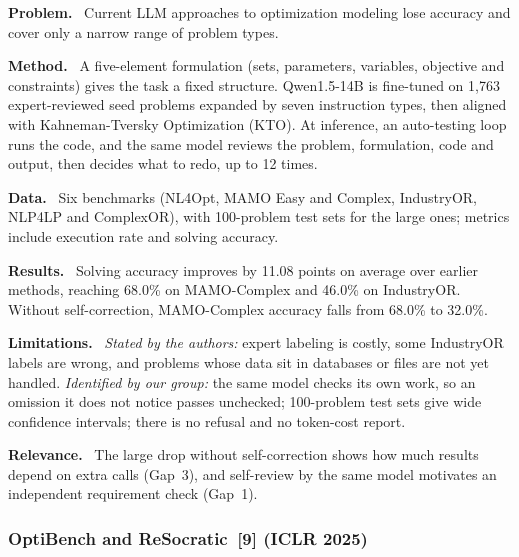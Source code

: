 \documentclass[11pt,a4paper]{article}
\newcommand{\elem}[1]{\par\noindent\textbf{#1.}~}
\begin{document}
\elem{Problem} Current LLM approaches to optimization modeling lose accuracy and cover only a narrow range of problem types.
\elem{Method} A five-element formulation (sets, parameters, variables, objective and constraints) gives the task a fixed structure. Qwen1.5-14B is fine-tuned on 1,763 expert-reviewed seed problems expanded by seven instruction types, then aligned with Kahneman-Tversky Optimization (KTO). At inference, an auto-testing loop runs the code, and the same model reviews the problem, formulation, code and output, then decides what to redo, up to 12 times.
\elem{Data} Six benchmarks (NL4Opt, MAMO Easy and Complex, IndustryOR, NLP4LP and ComplexOR), with 100-problem test sets for the large ones; metrics include execution rate and solving accuracy.
\elem{Results} Solving accuracy improves by 11.08 points on average over earlier methods, reaching 68.0\% on MAMO-Complex and 46.0\% on IndustryOR. Without self-correction, MAMO-Complex accuracy falls from 68.0\% to 32.0\%.
\elem{Limitations} \textit{Stated by the authors:} expert labeling is costly, some IndustryOR labels are wrong, and problems whose data sit in databases or files are not yet handled. \textit{Identified by our group:} the same model checks its own work, so an omission it does not notice passes unchecked; 100-problem test sets give wide confidence intervals; there is no refusal and no token-cost report.
\elem{Relevance} The large drop without self-correction shows how much results depend on extra calls (Gap~3), and self-review by the same model motivates an independent requirement check (Gap~1).

\subsubsection[OptiBench and ReSocratic (ICLR 2025)]{OptiBench and ReSocratic~[9] (ICLR 2025)}
\end{document}
